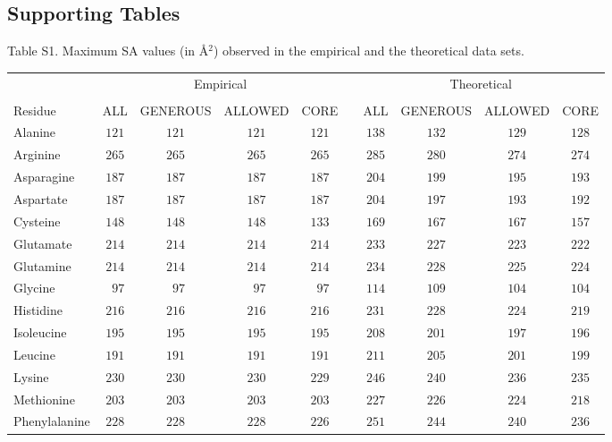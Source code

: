 \documentclass[12pt]{article}
\begin{document}
\newpage


\subsection*{Supporting Tables}



\noindent Table S1. Maximum SA values (in \AA$^2$) observed in the empirical and the theoretical data sets.

\begin{center}
\scriptsize
\begin{tabular}{lccccccccc}
 & \multicolumn{4}{c}{Empirical} &&\multicolumn{4}{c}{Theoretical}\\\cline{2-5}\cline{7-10}\\[-1.6ex]
Residue          & ALL & GENEROUS & ALLOWED & CORE & & ALL & GENEROUS & ALLOWED & CORE\\
\hline Alanine   & $121$ & $121$ & $121$ & $121$ & & $138$ & $132$ & $129$ & $128$\\
Arginine         & $265$ & $265$ & $265$ & $265$ & & $285$ & $280$ & $274$ & $274$\\
Asparagine       & $187$ & $187$ & $187$ & $187$ & & $204$ & $199$ & $195$ & $193$\\
Aspartate        & $187$ & $187$ & $187$ & $187$ & & $204$ & $197$ & $193$ & $192$\\
Cysteine         & $148$ & $148$ & $148$ & $133$ & & $169$ & $167$ & $167$ & $157$\\
Glutamate        & $214$ & $214$ & $214$ & $214$ & & $233$ & $227$ & $223$ & $222$\\
Glutamine        & $214$ & $214$ & $214$ & $214$ & & $234$ & $228$ & $225$ & $224$\\
Glycine          & $\phantom{0}97$ & $\phantom{0}97$ & $\phantom{0}97$ & $\phantom{0}97$ & & $114$ & $109$ & $104$ & $104$\\
Histidine        & $216$ & $216$ & $216$ & $216$ & & $231$ & $228$ & $224$ & $219$\\
Isoleucine       & $195$ & $195$ & $195$ & $195$ & & $208$ & $201$ & $197$ & $196$\\
Leucine          & $191$ & $191$ & $191$ & $191$ & & $211$ & $205$ & $201$ & $199$\\
Lysine           & $230$ & $230$ & $230$ & $229$ & & $246$ & $240$ & $236$ & $235$\\
Methionine       & $203$ & $203$ & $203$ & $203$ & & $227$ & $226$ & $224$ & $218$\\
Phenylalanine    & $228$ & $228$ & $228$ & $226$ & & $251$ & $244$ & $240$ & $236$\\

\end{tabular}
\end{center}
\end{document}
